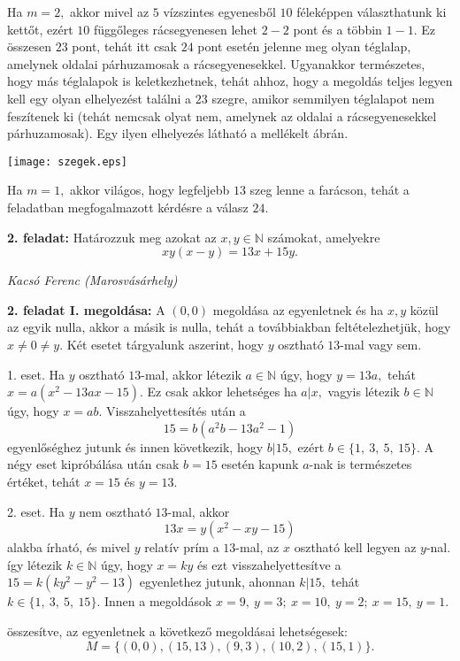 \documentclass[a4paper,10pt]{article}
\def\ki#1#2{\hfill {\it #1 (#2)}\medskip}
\begin{document}
Ha $m=2,$ akkor mivel az $5$ vízszintes egyenesből $10$
féleképpen választhatunk ki kettőt, ezért $10$ függ\H
oleges rácsegyenesen lehet $2-2$ pont és a többin $1-1.$ Ez
összesen $23$ pont, tehát itt csak $24$ pont esetén jelenne
meg olyan téglalap, amelynek oldalai párhuzamosak a
rácsegyenesekkel. Ugyanakkor természetes, hogy más
téglalapok is keletkezhetnek, tehát ahhoz, hogy a megoldás
teljes legyen kell egy olyan elhelyezést találni a $23$ szegre,
amikor semmilyen téglalapot nem feszítenek ki (tehát nemcsak
olyat nem, amelynek az oldalai a rácsegyenesekkel párhuzamosak).
Egy ilyen elhelyezés látható a mellékelt ábrán.

\centerline{\texttt{[image: szegek.eps]}}

Ha $m=1,$ akkor világos, hogy legfeljebb $13$ szeg lenne a
farácson, tehát a feladatban megfogalmazott kérdésre a
válasz $24.$

\medskip

{\bf 2. feladat: } Határozzuk meg azokat
az $x,y\in \mathbb{N}$ számokat, amelyekre
$$xy(x-y)=13x+15y.$$

\ki{Kacsó Ferenc}{Marosvásárhely}\medskip

\textbf{2. feladat I. megoldása: } A $(0,0)$ megoldása az egyenletnek és ha $x,y$ közül az
egyik nulla, akkor a másik is nulla, tehát a továbbiakban
feltételezhetjük, hogy $x\neq 0\neq y.$ Két esetet tárgyalunk
aszerint, hogy $y$ osztható $13$-mal vagy sem.

1. eset. Ha $y$ osztható $13$-mal, akkor létezik
$a\in\mathbb{N}$ úgy, hogy $y=13a,$ tehát $x=a(x^2-13ax-15).$ Ez
csak akkor lehetséges ha $a|x,$ vagyis létezik $b\in\mathbb{N}$
úgy, hogy $x=ab.$ Visszahelyettesítés után a
$$15=b(a^2b-13a^2-1)$$ egyenlőséghez jutunk és innen következik, hogy $b|15,$ ezért
$b\in\{1,\ 3,\ 5,\ 15\}.$ A négy eset kipróbálása után
csak $b=15$ esetén kapunk $a$-nak is természetes értéket,
tehát $x=15$ és $y=13.$

2. eset. Ha $y$ nem osztható $13$-mal, akkor
$$13x=y(x^2-xy-15)$$ alakba írható, és mivel $y$ relatív prím a $13$-mal, az $x$ osztható kell legyen az $y$-nal.
így létezik $k\in\mathbb{N}$ úgy, hogy $x=ky$ és ezt
visszahelyettesítve a $15=k(ky^2-y^2-13)$ egyenlethez jutunk,
ahonnan $k|15,$ tehát $k\in\{1,\ 3,\ 5,\ 15\}.$ Innen a megoldások
$x=9,\ y=3;\ x=10,\ y=2;\ x=15,\ y=1.$

összesítve, az egyenletnek a következő megoldásai
lehetségesek:
$$M=\{(0,0),(15,13),(9,3),(10,2),(15,1)\}.$$

\medskip
\end{document}
